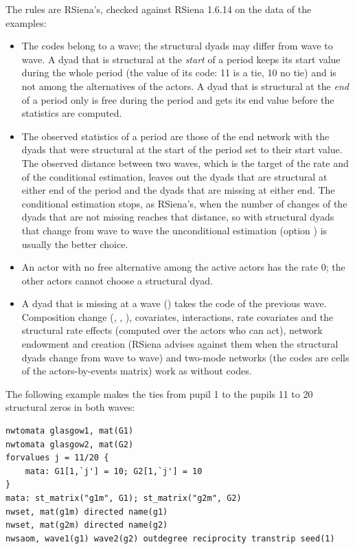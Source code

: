 The rules are RSiena's, checked against RSiena 1.6.14 on the data of the examples:
\begin{itemize}
\item The codes belong to a wave; the structural dyads may differ from wave to wave. A dyad that is structural at the \emph{start} of a period keeps its start value during the whole period (the value of its code: 11 is a tie, 10 no tie) and is not among the alternatives of the actors. A dyad that is structural at the \emph{end} of a period only is free during the period and gets its end value before the statistics are computed.
\item The observed statistics of a period are those of the end network with the dyads that were structural at the start of the period set to their start value. The observed distance between two waves, which is the target of the rate and of the conditional estimation, leaves out the dyads that are structural at either end of the period and the dyads that are missing at either end. The conditional estimation stops, as RSiena's, when the number of changes of the dyads that are not missing reaches that distance, so with structural dyads that change from wave to wave the unconditional estimation (option ) is usually the better choice.
\item An actor with no free alternative among the active actors has the rate 0; the other actors cannot choose a structural dyad.
\item A dyad that is missing at a wave () takes the code of the previous wave. Composition change (, , ), covariates, interactions, rate covariates and the structural rate effects (computed over the actors who can act), network endowment and creation (RSiena advises against them when the structural dyads change from wave to wave) and two-mode networks (the codes are cells of the actors-by-events matrix) work as without codes.
\end{itemize}
The following example makes the ties from pupil 1 to the pupils 11 to 20 structural zeros in both waves:
\begin{lstlisting}
nwtomata glasgow1, mat(G1)
nwtomata glasgow2, mat(G2)
forvalues j = 11/20 {
    mata: G1[1,`j'] = 10; G2[1,`j'] = 10
}
mata: st_matrix("g1m", G1); st_matrix("g2m", G2)
nwset, mat(g1m) directed name(g1)
nwset, mat(g2m) directed name(g2)
nwsaom, wave1(g1) wave2(g2) outdegree reciprocity transtrip seed(1)
\end{lstlisting}

